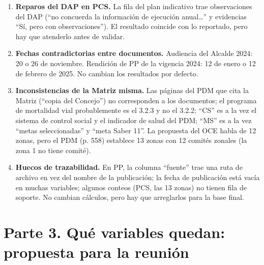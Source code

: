 \documentclass[11pt,letterpaper]{article}
\begin{document}
\begin{enumerate}
\begin{itemize}
\item PC.I2 2025: la fuente dice ``12 asambleas\ldots{} cubriendo la totalidad de las zonas'' sin listarlas; se asignaron a las zonas 2 a 13. Si ``totalidad'' son 13 zonas, sería 13/13.
\item PC.I3 2025: el denominador se reconstruyó como culminadas más no ejecutadas, y se excluyó el diplomado en Gestión Pública por ser para servidores, algo que la fuente no acredita.
\end{itemize}
\item \textbf{Reparos del DAP en PCS.} La fila del plan indicativo trae observaciones del DAP (``no concuerda la información de ejecución anual\ldots{}'' y evidencias ``Sí, pero con observaciones''). El resultado coincide con lo reportado, pero hay que atenderlo antes de validar.
\item \textbf{Fechas contradictorias entre documentos.} Audiencia del Alcalde 2024: 20 o 26 de noviembre. Rendición de PP de la vigencia 2024: 12 de enero o 12 de febrero de 2025. No cambian los resultados por defecto.
\item \textbf{Inconsistencias de la Matriz misma.} Las páginas del PDM que cita la Matriz (``copia del Concejo'') no corresponden a los documentos; el programa de mortalidad vial probablemente es el 3.2.3 y no el 3.2.2; ``CS'' es a la vez el sistema de control social y el indicador de salud del PDM; ``MS'' es a la vez ``metas seleccionadas'' y ``meta Saber 11''. La propuesta del OCE habla de 12 zonas, pero el PDM (p. 558) establece 13 zonas con 12 comités zonales (la zona 1 no tiene comité).
\item \textbf{Huecos de trazabilidad.} En PP, la columna ``fuente'' trae una ruta de archivo en vez del nombre de la publicación; la fecha de publicación está vacía en muchas variables; algunos conteos (PCS, las 13 zonas) no tienen fila de soporte. No cambian cálculos, pero hay que arreglarlos para la base final.
\end{enumerate}

\clearpage

\section*{Parte 3. Qué variables quedan: propuesta para la reunión}


\begin{center}\end{center}
\end{document}
